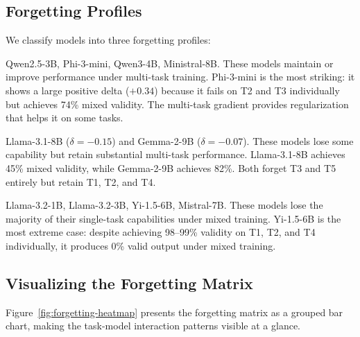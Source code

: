 \documentclass[11pt]{article}
\begin{document}
\subsection{Forgetting Profiles}

We classify models into three forgetting profiles:

\begin{description}[leftmargin=*]
\item[Robust ($\delta > -0.05$, 4 models):] Qwen2.5-3B, Phi-3-mini, Qwen3-4B, Ministral-8B.  These models maintain or improve performance under multi-task training.  Phi-3-mini is the most striking: it shows a large positive delta ($+0.34$) because it fails on T2 and T3 individually but achieves 74\% mixed validity.  The multi-task gradient provides regularization that helps it on some tasks.

\item[Selective ($-0.30 < \delta \leq -0.05$, 2 models):] Llama-3.1-8B ($\delta = -0.15$) and Gemma-2-9B ($\delta = -0.07$).  These models lose some capability but retain substantial multi-task performance.  Llama-3.1-8B achieves 45\% mixed validity, while Gemma-2-9B achieves 82\%.  Both forget T3 and T5 entirely but retain T1, T2, and T4.

\item[Catastrophic ($\delta \leq -0.30$, 4 models):] Llama-3.2-1B, Llama-3.2-3B, Yi-1.5-6B, Mistral-7B.  These models lose the majority of their single-task capabilities under mixed training.  Yi-1.5-6B is the most extreme case: despite achieving 98--99\% validity on T1, T2, and T4 individually, it produces 0\% valid output under mixed training.
\end{description}

\subsection{Visualizing the Forgetting Matrix}

Figure~\ref{fig:forgetting-heatmap} presents the forgetting matrix as a grouped bar chart, making the task-model interaction patterns visible at a glance.
\end{document}
